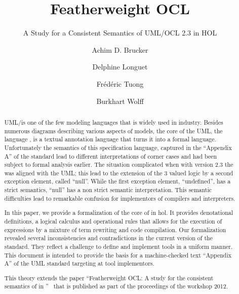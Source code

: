 \documentclass[11pt,a4paper,openright,twoside,abstracton]{scrreprt}
\begin{document}
\title{Featherweight OCL}
\subtitle{A Study for a Consistent Semantics of UML/OCL 2.3 in HOL}
\subject{Extended Version}
\author{Achim D. Brucker \and Delphine Longuet \and Fr\'ed\'eric Tuong \and Burkhart Wolff}


\maketitle

\begin{abstract}
  UML/\OCL is one of the few modeling languages that is widely used in industry.
  Besides numerous diagrams describing various aspects of models, the core of the UML, 
  the language \OCL,   
  is a textual annotation language that turns it into a formal language.
  Unfortunately the semantics of this specification language, captured in the ``Appendix A''
  of the \OCL standard lead to different interpretations of corner cases and had been subject
  to formal analysis earlier. %
  The situation complicated when with version 2.3 the \OCL was aligned with the UML; this 
  lead to the extension of the 3 valued logic by a second exception element, called ``null''.
  While the first exception element, ``undefined'', has a strict semantics, ``null'' has a non strict semantic
  interpretation. This semantic difficulties lead to remarkable confusion for implementors 
  of \OCL compilers and interpreters. %

  In this paper, we provide a formalization of the core of
  \OCL in \acf{hol}. It provides denotational definitions, a logical calculus
  and operational rules that allows for the execution of \OCL expressions by a mixture of
  term rewriting and code compilation. 
  Our formalization revealed several
  inconsistencies and contradictions in the current version of the
  \OCL standard.  They reflect a challenge to define and implement \OCL tools in a
  uniform manner.
  This document is intended to provide the basis for a machine-checked text
  ``Appendix A'' of the UML standard targeting at tool implementors.
  

  
  \vspace{1cm} This theory extends the paper
  ``Featherweight OCL: A study for the consistent semantics of 
  in \HOL''~\cite{brucker.ea:featherweight:2012} that is published as
  part of the proceedings of the \OCL workshop 2012.
\end{abstract}



\tableofcontents







\listofacronyms{}
\end{document}
